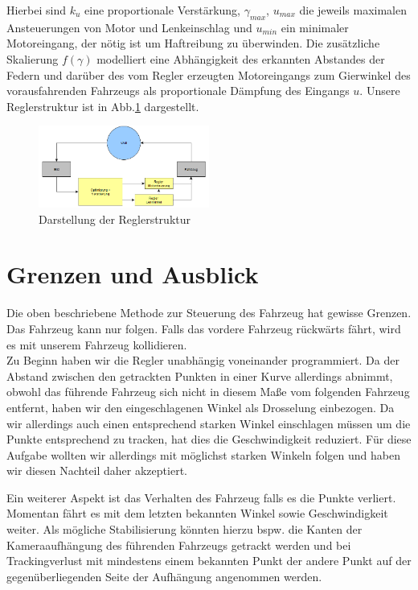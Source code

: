 \documentclass[10pt]{article}
\begin{document}
Hierbei sind $k_{u}$ eine proportionale Verstärkung, $\gamma_{max}$, $u_{max}$ die jeweils maximalen Ansteuerungen von Motor und Lenkeinschlag und $u_{min}$ ein minimaler Motoreingang, der nötig ist um Haftreibung zu überwinden. Die zusätzliche Skalierung $f(\gamma)$ modelliert eine Abhängigkeit des erkannten Abstandes der Federn und darüber des vom Regler erzeugten Motoreingangs zum Gierwinkel des vorausfahrenden Fahrzeugs als proportionale Dämpfung des Eingangs $u$. Unsere Reglerstruktur ist in Abb.\ref{fig:struktur} dargestellt.\\
\begin{figure}[hbtp]
    \centering
    \includegraphics[width=0.5\textwidth]{Autonomes_Fahren_Welt_Regler}
    \caption{Darstellung der Reglerstruktur}
    \label{fig:struktur}
\end{figure}


\section{Grenzen und Ausblick}
Die oben beschriebene Methode zur Steuerung des Fahrzeug hat gewisse Grenzen.
Das Fahrzeug kann nur folgen.
Falls das vordere Fahrzeug rückwärts fährt, wird es mit unserem Fahrzeug kollidieren.\\
Zu Beginn haben wir die Regler unabhängig voneinander programmiert.
Da der Abstand zwischen den getrackten Punkten in einer Kurve allerdings abnimmt, obwohl das führende Fahrzeug sich nicht in diesem Maße vom folgenden Fahrzeug entfernt, haben wir den eingeschlagenen Winkel als Drosselung einbezogen.
Da wir allerdings auch einen entsprechend starken Winkel einschlagen müssen um die Punkte entsprechend zu tracken, hat dies die Geschwindigkeit reduziert.
Für diese Aufgabe wollten wir allerdings mit möglichst starken Winkeln folgen und haben wir diesen Nachteil daher akzeptiert.


Ein weiterer Aspekt ist das Verhalten des Fahrzeug falls es die Punkte verliert.
Momentan fährt es mit dem letzten bekannten Winkel sowie Geschwindigkeit weiter.
Als mögliche Stabilisierung könnten hierzu bspw.
die Kanten der Kameraaufhängung des führenden Fahrzeugs getrackt werden und bei Trackingverlust mit mindestens einem bekannten Punkt der andere Punkt auf der gegenüberliegenden Seite der Aufhängung angenommen werden.
\end{document}
